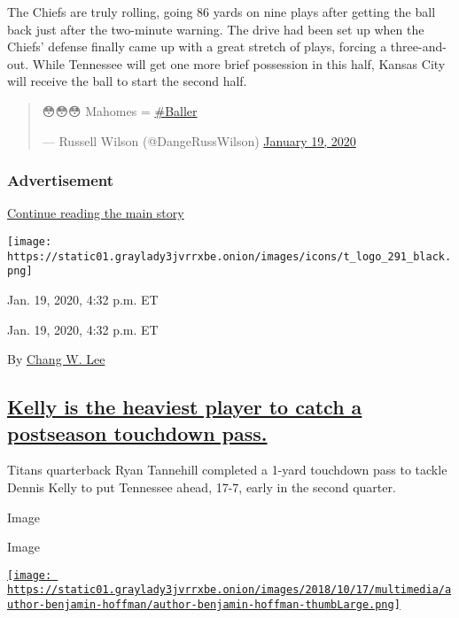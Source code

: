 The Chiefs are truly rolling, going 86 yards on nine plays after getting
the ball back just after the two-minute warning. The drive had been set
up when the Chiefs' defense finally came up with a great stretch of
plays, forcing a three-and-out. While Tennessee will get one more brief
possession in this half, Kansas City will receive the ball to start the
second half.

\begin{quote}
😳😳😳 Mahomes =
\href{https://twitter.com/hashtag/Baller?src=hash\&ref_src=twsrc\%5Etfw}{\#Baller}

--- Russell Wilson (@DangeRussWilson)
\href{https://twitter.com/DangeRussWilson/status/1219009810760208384?ref_src=twsrc\%5Etfw}{January
19, 2020}
\end{quote}

\hypertarget{advertisement-3}{%
\subsubsection{Advertisement}\label{advertisement-3}}

\protect\hyperlink{after-dfp-ad-mid4}{Continue reading the main story}

\texttt{[image: https://static01.graylady3jvrrxbe.onion/images/icons/t\_logo\_291\_black.png]}

Jan. 19, 2020, 4:32 p.m. ET

Jan. 19, 2020, 4:32 p.m. ET

By \href{https://www.nytimes3xbfgragh.onion/by/chang-w-lee}{Chang W.
Lee}

\hypertarget{kelly-is-the-heaviest-player-to-catch-a-postseason-touchdown-pass}{%
\subsection{\texorpdfstring{\protect\hyperlink{kelly-is-the-heaviest-player-to-catch-a-postseason-touchdown-pass}{Kelly
is the heaviest player to catch a postseason touchdown
pass.}}{Kelly is the heaviest player to catch a postseason touchdown pass.}}\label{kelly-is-the-heaviest-player-to-catch-a-postseason-touchdown-pass}}

Titans quarterback Ryan Tannehill completed a 1-yard touchdown pass to
tackle Dennis Kelly to put Tennessee ahead, 17-7, early in the second
quarter.

Image

Image

\href{https://www.nytimes3xbfgragh.onion/by/benjamin-hoffman}{\texttt{[image: https://static01.graylady3jvrrxbe.onion/images/2018/10/17/multimedia/author-benjamin-hoffman/author-benjamin-hoffman-thumbLarge.png]}}

